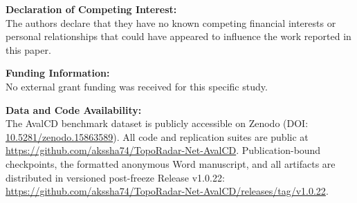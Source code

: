\documentclass[12pt,a4paper]{article}
\begin{document}
\vspace{1.0em}

\noindent\textbf{Declaration of Competing Interest:} \\
The authors declare that they have no known competing financial interests or personal relationships that could have appeared to influence the work reported in this paper.

\vspace{1.0em}

\noindent\textbf{Funding Information:} \\
No external grant funding was received for this specific study.

\vspace{1.0em}

\noindent\textbf{Data and Code Availability:} \\
The AvalCD benchmark dataset is publicly accessible on Zenodo (DOI: \href{https://doi.org/10.5281/zenodo.15863589}{10.5281/zenodo.15863589}). All code and replication suites are public at \url{https://github.com/akssha74/TopoRadar-Net-AvalCD}. Publication-bound checkpoints, the formatted anonymous Word manuscript, and all artifacts are distributed in versioned post-freeze Release v1.0.22: \url{https://github.com/akssha74/TopoRadar-Net-AvalCD/releases/tag/v1.0.22}.
\end{document}
